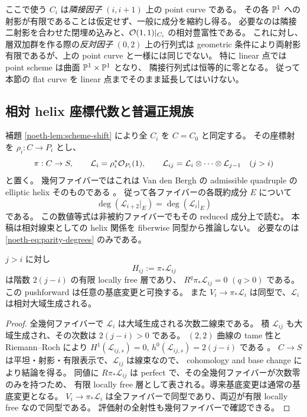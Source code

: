 \begin{remark}
ここで使う $C_i$ は\emph{隣接因子} $(i,i+1)$ 上の point curve である。
その各 $\mathbb P^1$ への射影が有限であることは仮定せず、一般に成分を縮約し得る。
必要なのは隣接二射影を合わせた閉埋め込みと、$\mathcal O(1,1)|_{C_i}$ の相対豊富性である。
これに対し、層双加群を作る際の\emph{反対因子} $(0,2)$ 上の行列式は
geometric 条件により両射影有限であるが、上の point curve と一様には同じでない。
特に linear 点では point scheme は曲面 $\mathbb P^1\times\mathbb P^1$ となり、
隣接行列式は恒等的に零となる。
従って本節の flat curve を linear 点までそのまま延長してはいけない。
\end{remark}

\subsection{相対 helix 座標代数と普遍正規族}

補題 \ref{noeth-lem:scheme-shift} により全 $C_i$ を $C=C_0$ と同定する。
その座標射を $\rho_i:C\to P_i$ とし、
\[
 \pi:C\to S,\qquad \mathcal L_i=\rho_i^*\mathcal O_{P_i}(1),\qquad
 \mathcal L_{ij}=\mathcal L_i\otimes\cdots\otimes\mathcal L_{j-1}\quad(j>i)
\]
と置く。
幾何ファイバーではこれは Van den Bergh の admissible quadruple の elliptic helix そのものである
\cite[\S5.4, Lemma 5.5.1, Theorem 5.5.10]{VdB2011}。
従って各ファイバーの各既約成分 $E$ について
\begin{equation}\label{noeth-eq:parity-degrees}
 \deg(\mathcal L_{i+2}|_E)=\deg(\mathcal L_i|_E)
\end{equation}
である。
この数値等式は非被約ファイバーでもその reduced 成分上で読む。
本稿は相対線束としての helix 関係を fiberwise 同型から推論しない。
必要なのは \eqref{noeth-eq:parity-degrees} のみである。

\begin{lemma}\label{noeth-lem:cohomology-bc}
$j>i$ に対し
\[
 H_{ij}:=\pi_*\mathcal L_{ij}
\]
は階数 $2(j-i)$ の有限 locally free 層であり、
$R^{q}\pi_*\mathcal L_{ij}=0$ $(q>0)$ である。
この pushforward は任意の基底変更と可換する。
また $V_i\to\pi_*\mathcal L_i$ は同型で、$\mathcal L_i$ は相対大域生成される。
\end{lemma}

\begin{proof}
全幾何ファイバーで $\mathcal L_i$ は大域生成される次数二線束である。
積 $\mathcal L_{ij}$ も大域生成され、その次数は $2(j-i)>0$ である。
$(2,2)$ 曲線の tame 性と Riemann--Roch により
$H^1(\mathcal L_{ij,s})=0$, $h^0(\mathcal L_{ij,s})=2(j-i)$ である
\cite[Proposition 5.4.2, Lemma 5.5.3]{VdB2011}。
$C\to S$ は平坦・射影・有限表示で、$\mathcal L_{ij}$ は線束なので、
cohomology and base change により結論を得る。
同値に $R\pi_*\mathcal L_{ij}$ は perfect で、その全幾何ファイバーが次数零のみを持つため、
有限 locally free 層として表される。導来基底変更は通常の基底変更となる。
$V_i\to\pi_*\mathcal L_i$ は全ファイバーで同型であり、両辺が有限 locally free なので同型である。
評価射の全射性も幾何ファイバーで確認できる。
\end{proof}

